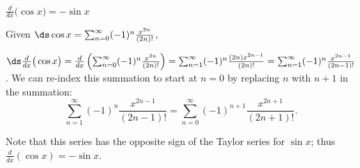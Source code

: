 {$\frac{d}{dx}\big(\cos x\big) = -\sin x$
}
{Given $\ds \cos x = \sum_{n=0}^\infty (-1)^n\frac{x^{2n}}{(2n)!}$,

$\ds\frac{d}{dx}\big(\cos x\big)  = \frac{d}{dx}\left(\sum_{n=0}^\infty (-1)^n\frac{x^{2n}}{(2n)!}\right)=\sum_{n=1}^\infty (-1)^n\frac{(2n)x^{2n-1}}{(2n)!}=\sum_{n=1}^\infty (-1)^n\frac{x^{2n-1}}{(2n-1)!}$. We can re-index this summation to start at $n=0$ by replacing $n$ with $n+1$ in the summation:
$$ \sum_{n=1}^\infty (-1)^n\frac{x^{2n-1}}{(2n-1)!} =\sum_{n=0}^\infty (-1)^{n+1}\frac{x^{2n+1}}{(2n+1)!}.$$

Note that this series has the opposite sign of the Taylor series for $\sin x$; thus $\frac{d}{dx}(\cos x) = -\sin x$.
}